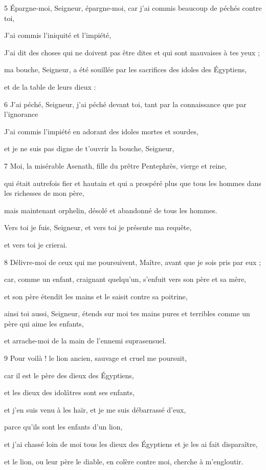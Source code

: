 \par 5 Épargne-moi, Seigneur, épargne-moi, car j'ai commis beaucoup de péchés contre toi,
\par J'ai commis l'iniquité et l'impiété,
\par J'ai dit des choses qui ne doivent pas être dites et qui sont mauvaises à tes yeux ;
\par ma bouche, Seigneur, a été souillée par les sacrifices des idoles des Égyptiens,
\par et de la table de leurs dieux :

\par 6 J'ai péché, Seigneur, j'ai péché devant toi, tant par la connaissance que par l'ignorance
\par J'ai commis l'impiété en adorant des idoles mortes et sourdes,
\par et je ne suis pas digne de t'ouvrir la bouche, Seigneur,

\par 7 Moi, la misérable Asenath, fille du prêtre Pentephrès, vierge et reine,
\par qui était autrefois fier et hautain et qui a prospéré plus que tous les hommes dans les richesses de mon père,
\par mais maintenant orphelin, désolé et abandonné de tous les hommes.
\par Vers toi je fuis, Seigneur, et vers toi je présente ma requête,
\par et vers toi je crierai.

\par 8 Délivre-moi de ceux qui me poursuivent, Maître, avant que je sois pris par eux ;
\par car, comme un enfant, craignant quelqu'un, s'enfuit vers son père et sa mère,
\par et son père étendit les mains et le saisit contre sa poitrine,
\par ainsi toi aussi, Seigneur, étends sur moi tes mains pures et terribles comme un père qui aime les enfants,
\par et arrache-moi de la main de l'ennemi suprasensuel.

\par 9 Pour voilà ! le lion ancien, sauvage et cruel me poursuit,
\par car il est le père des dieux des Égyptiens,
\par et les dieux des idolâtres sont ses enfants,
\par et j'en suis venu à les haïr, et je me suis débarrassé d'eux,
\par parce qu'ils sont les enfants d'un lion,
\par et j'ai chassé loin de moi tous les dieux des Égyptiens et je les ai fait disparaître,
\par et le lion, ou leur père le diable, en colère contre moi, cherche à m'engloutir.

